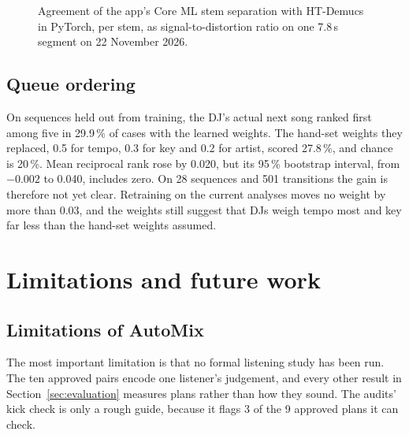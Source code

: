 \documentclass[conference,a4paper]{IEEEtran}
\begin{document}
\begin{figure}[t]
\centering
{}
\caption{Agreement of the app's Core ML stem separation with HT-Demucs in PyTorch, per stem, as
signal-to-distortion ratio on one 7.8\,s segment on 22 November 2026.}
\label{fig:sdr}
\end{figure}

\subsection{Queue ordering}
On sequences held out from training, the DJ's actual next song ranked first among five in
29.9\,\% of cases with the learned weights. The hand-set weights they replaced, 0.5 for tempo, 0.3
for key and 0.2 for artist, scored 27.8\,\%, and chance is 20\,\%. Mean reciprocal rank rose by
0.020, but its 95\,\% bootstrap interval, from $-0.002$ to 0.040, includes zero. On 28 sequences
and 501 transitions the gain is therefore not yet clear. Retraining on the current analyses moves
no weight by more than 0.03, and the weights still suggest that DJs weigh tempo most and key far
less than the hand-set weights assumed.

\section{Limitations and future work}\label{sec:limits}

\subsection{Limitations of AutoMix}
The most important limitation is that no formal listening study has been run. The ten approved
pairs encode one listener's judgement, and every other result in Section~\ref{sec:evaluation}
measures plans rather than how they sound. The audits' kick check is only a rough guide, because it
flags 3 of the 9 approved plans it can check.
\end{document}
